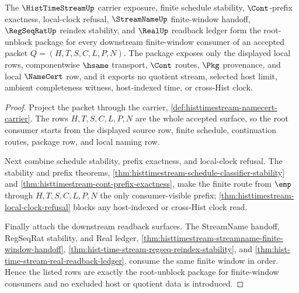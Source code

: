\begin{theorem}
\label{thm:histtimestream-namecert-root-unblock-package}
The $\HistTimeStreamUp$ carrier exposure, finite schedule stability, $\Cont$-prefix exactness, local-clock refusal, $\StreamNameUp$ finite-window handoff, $\RegSeqRatUp$ reindex stability, and $\RealUp$ readback ledger form the root-unblock package for every downstream finite-window consumer of an accepted packet $Q=(H,T,S,C,L,P,N)$. The package exposes only the displayed local rows, componentwise $\hsame$ transport, $\Cont$ routes, $\Pkg$ provenance, and local $\NameCert$ row, and it exports no quotient stream, selected host limit, ambient completeness witness, host-indexed time, or cross-Hist clock.
\end{theorem}
\begin{proof}
Project the packet through the carrier, \autoref{def:histtimestream-namecert-carrier}. The rows $H,T,S,C,L,P,N$ are the whole accepted surface, so the root consumer starts from the displayed source row, finite schedule, continuation routes, package row, and local naming row.

Next combine schedule stability, prefix exactness, and local-clock refusal. The stability and prefix theorems, \autoref{thm:histtimestream-schedule-classifier-stability} and \autoref{thm:histtimestream-cont-prefix-exactness}, make the finite route from $\emp$ through $H,T,S,C,L,P,N$ the only consumer-visible prefix; \autoref{thm:histtimestream-local-clock-refusal} blocks any host-indexed or cross-Hist clock read.

Finally attach the downstream readback surfaces. The StreamName handoff, RegSeqRat stability, and Real ledger, \autoref{thm:histtimestream-streamname-finite-window-handoff}, \autoref{thm:hist-time-stream-regseq-reindex-stability}, and \autoref{thm:hist-time-stream-real-readback-ledger}, consume the same finite window in order. Hence the listed rows are exactly the root-unblock package for finite-window consumers and no excluded host or quotient data is introduced.
\end{proof}

